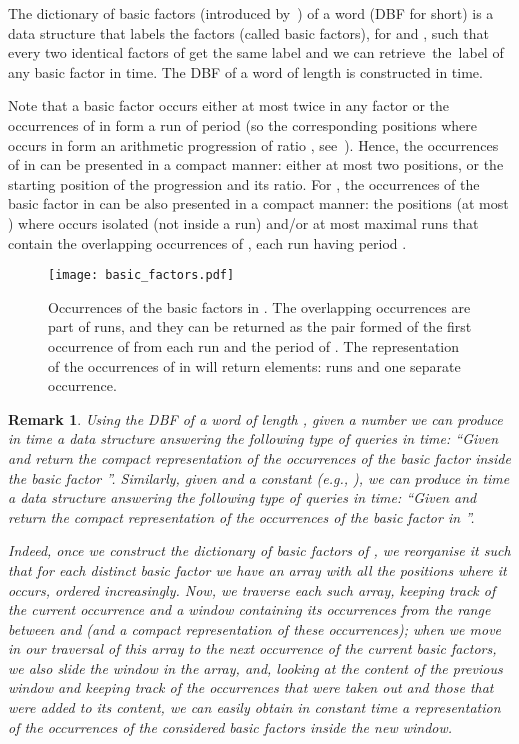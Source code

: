 \documentclass[final]{dmtcs-episciences}
\newtheorem{remark}{Remark}
\begin{document}
The dictionary of basic factors (introduced by~\cite{DBF}) of a word  (DBF for short) is a data structure that labels the factors  (called basic factors), for  and , such that every two identical factors of  get the same label and we can retrieve~the~label of any basic factor in  time. The DBF of a word of length  is constructed in  time. 

Note that a basic factor  occurs either at most twice in any factor  or the occurrences of  in  form a run of period  (so the corresponding positions where  occurs in  form an arithmetic progression of ratio , see~\cite{KociumakaSPIRE2012}). Hence, the occurrences of   in  can be presented in a compact manner: either at most two positions, or the starting position of the progression and its ratio. For , the occurrences of the basic factor  in  can be also presented in a compact manner: the positions (at most ) where  occurs isolated (not inside a run) and/or at most  maximal runs that contain the overlapping occurrences of , each run having period .

\begin{figure}\begin{center}
\texttt{[image: basic\_factors.pdf]}
\end{center}
\vspace*{-2.5cm}
\caption{Occurrences of the basic factors  in . The overlapping occurrences are part of runs, and they can be returned as the pair formed of the first occurrence of  from each run and the period of . The representation of the occurrences of  in  will return  elements:  runs and one separate occurrence.}
\end{figure}

\begin{remark}\label{rem_DBF}
Using the DBF of a word  of length , given a number  we can produce in  time a data structure answering the following type of queries in  time: ``Given  and  return the compact representation of the occurrences of the basic factor  inside the basic factor ''. Similarly, given  and a constant  (e.g., ), we can produce in  time a data structure answering the following type of queries in  time: ``Given  and  return the compact representation of the occurrences of the basic factor  in  ''. 

Indeed, once we construct the dictionary of basic factors of , we reorganise it such that for each distinct basic factor we have an array with all the positions where it occurs, ordered increasingly. Now, we traverse each such array, keeping track of the current occurrence  and a window containing its occurrences from the range between  and  (and a compact representation of these occurrences); when we move in our traversal of this array to the next occurrence of the current basic factors, we also slide the window in the array, and, looking at the content of the previous window and keeping track of the occurrences that were taken out and those that were added to its content, we can easily obtain in constant time a representation of the occurrences of the considered basic factors inside the new window. 
\end{remark}
\end{document}
